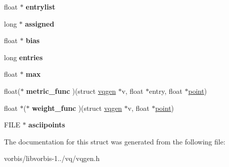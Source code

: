 \begin{DoxyCompactItemize}
\item 
\hypertarget{structvqgen_a5ee8b3519eb4f79d5a5216f915d5b307}{float $\ast$ {\bfseries entrylist}}\label{structvqgen_a5ee8b3519eb4f79d5a5216f915d5b307}

\item 
\hypertarget{structvqgen_af5cf3711c7395b27eb60442079cc1314}{long $\ast$ {\bfseries assigned}}\label{structvqgen_af5cf3711c7395b27eb60442079cc1314}

\item 
\hypertarget{structvqgen_a732fdab429939b8aea11f4ebc09f7b0d}{float $\ast$ {\bfseries bias}}\label{structvqgen_a732fdab429939b8aea11f4ebc09f7b0d}

\item 
\hypertarget{structvqgen_a1e787843315b3dfd83e0eaa9e5711043}{long {\bfseries entries}}\label{structvqgen_a1e787843315b3dfd83e0eaa9e5711043}

\item 
\hypertarget{structvqgen_adb896c1640a7b1d447562e7fe153385f}{float $\ast$ {\bfseries max}}\label{structvqgen_adb896c1640a7b1d447562e7fe153385f}

\item 
\hypertarget{structvqgen_ac2230570b89d0e3218ab17d5c0bee839}{float($\ast$ {\bfseries metric\+\_\+func} )(struct \hyperlink{structvqgen}{vqgen} $\ast$v, float $\ast$entry, float $\ast$\hyperlink{structpoint}{point})}\label{structvqgen_ac2230570b89d0e3218ab17d5c0bee839}

\item 
\hypertarget{structvqgen_ab9038fdf7bae91bea70aea31589e20c6}{float $\ast$($\ast$ {\bfseries weight\+\_\+func} )(struct \hyperlink{structvqgen}{vqgen} $\ast$v, float $\ast$\hyperlink{structpoint}{point})}\label{structvqgen_ab9038fdf7bae91bea70aea31589e20c6}

\item 
\hypertarget{structvqgen_afcbd08153512db099bad79df014e48b9}{F\+I\+L\+E $\ast$ {\bfseries asciipoints}}\label{structvqgen_afcbd08153512db099bad79df014e48b9}

\end{DoxyCompactItemize}


The documentation for this struct was generated from the following file\+:\begin{DoxyCompactItemize}
\item 
vorbis/libvorbis-\/1../vq/vqgen.\+h\end{DoxyCompactItemize}
